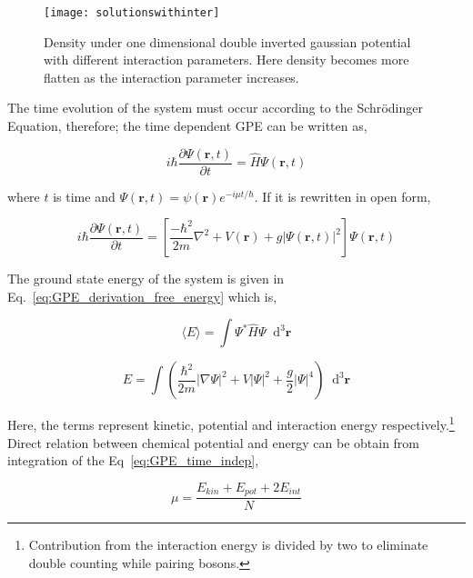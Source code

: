 \documentclass[a4paper,times,hidelinks,12pt]{article}
\newcommand*\dif{\mathop{}\!\mathrm{d}}
\begin{document}
\graphicspath{{"../figs/potentials/"}}
\begin{figure}[H]
    \centering
    \texttt{[image: solutionswithinter]}
    \caption{Density under one dimensional double inverted gaussian potential with different interaction parameters. Here density becomes more flatten as the interaction parameter increases.}
\label{fig:gaussian_pot_and_density}
\end{figure}


\noindent The time evolution of the system must occur according to the Schr{\"o}dinger Equation, therefore; the time dependent GPE can be written as,

\begin{equation}
\label{eq:GPE_time_evolution}
i \hbar \frac{\partial\Psi(\boldsymbol{r}, t)}{\partial t} = \hat{H}\Psi(\boldsymbol{r}, t)
\end{equation}

\noindent  where $t$ is time and $\Psi(\boldsymbol{r}, t) = \psi(\boldsymbol{r})e^{-i\mu t/\hbar} $. If it is rewritten in open form,

\begin{equation}
\label{eq:GPE_time_indep}
i \hbar \frac{\partial\Psi(\boldsymbol{r}, t)}{\partial t} = \left[\frac{-\hbar^2}{2m}\nabla^2 + V(\boldsymbol{r}) + g|\Psi(\boldsymbol{r}, t)|^2 \right] \Psi(\boldsymbol{r}, t)
\end{equation}

\noindent The ground state energy of the system is given in Eq.~\eqref{eq:GPE_derivation_free_energy} which is,

\begin{equation}
\label{eq:GPE_total_energy_general}
\langle E \rangle = \int \Psi^{*}\hat{H}\Psi \dif^3\boldsymbol{r}
\end{equation}

\begin{equation}
\label{eq:GPE_total_energy}
E = \int \left(\frac {\hbar^2}{2m}|\nabla
\Psi|^2 + V|\Psi|^2 + \frac{g}{2}|\Psi|^4 \right) \dif^3 \boldsymbol{r}
\end{equation}

\noindent Here, the terms represent kinetic, potential and interaction energy respectively.\footnote{Contribution from the interaction energy is divided by two to eliminate double counting while pairing bosons.} Direct relation between chemical potential and energy can be obtain from integration of the Eq~\eqref{eq:GPE_time_indep}, 

\begin{equation}
\label{eq:mu_and_total_en}
\mu = \frac{E_{kin} + E_{pot} + 2E_{int}}{N}
\end{equation}
\end{document}

